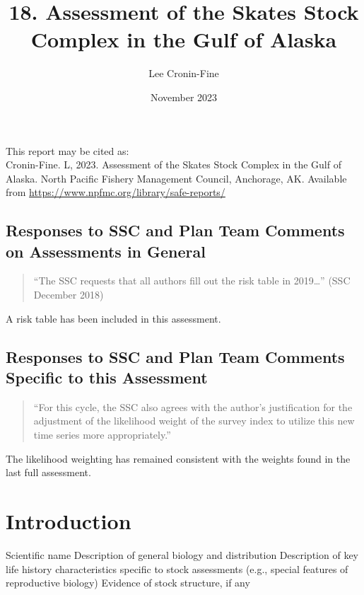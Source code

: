 \documentclass[
  11pt,
]{article}
\title{18. Assessment of the Skates Stock Complex in the Gulf of Alaska}
\author{Lee Cronin-Fine\textsuperscript{}}
\date{November 2023}
\begin{document}
\maketitle

This report may be cited as:\\
Cronin-Fine. L, 2023. Assessment of the Skates Stock Complex in the Gulf of Alaska. North Pacific Fishery Management Council, Anchorage, AK. Available from \url{https://www.npfmc.org/library/safe-reports/}

\hypertarget{responses-to-ssc-and-plan-team-comments-on-assessments-in-general}{%
\subsection{Responses to SSC and Plan Team Comments on Assessments in General}\label{responses-to-ssc-and-plan-team-comments-on-assessments-in-general}}

\begin{quote}
``The SSC requests that all authors fill out the risk table in 2019\ldots{}'' (SSC December 2018)
\end{quote}

A risk table has been included in this assessment.

\hypertarget{responses-to-ssc-and-plan-team-comments-specific-to-this-assessment}{%
\subsection{Responses to SSC and Plan Team Comments Specific to this Assessment}\label{responses-to-ssc-and-plan-team-comments-specific-to-this-assessment}}

\begin{quote}
``For this cycle, the SSC also agrees with the author's justification for the adjustment of the likelihood weight of the survey index to utilize this new time series more appropriately.''
\end{quote}

The likelihood weighting has remained consistent with the weights found in the last full assessment.

\hypertarget{introduction}{%
\section{Introduction}\label{introduction}}

Scientific name
Description of general biology and distribution
Description of key life history characteristics specific to stock assessments (e.g., special features of reproductive biology)
Evidence of stock structure, if any
\end{document}

